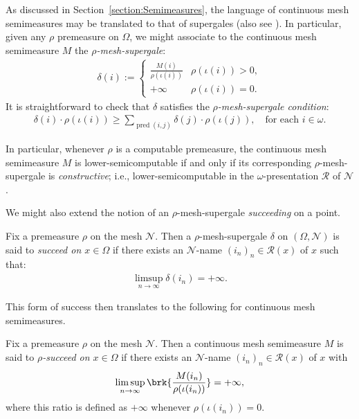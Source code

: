 As discussed in Section~\ref{section:Semimeasures}, the language of continuous mesh semimeasures may be translated to that of supergales (also see \cite{May14}). In particular, given any $\rho$ premeasure on $\Omega$, we might associate to the continuous mesh semimeasure $M$ the \textit{$\rho$-mesh-supergale}: 
\begin{align*}
    \delta(i) := \begin{cases}
        \frac{M(i)}{\rho(\iota(i))} & \rho(\iota(i)) > 0,\\
        +\infty & \rho(\iota(i)) = 0.
    \end{cases}
\end{align*}
It is straightforward to check that $\delta$ satisfies the \textit{$\rho$-mesh-supergale condition}:
\begin{align*}
    \delta(i) \cdot \rho(\iota(i)) \geq \sum_{\operatorname{pred}(i, j)} \delta(j) \cdot \rho(\iota(j)), \quad \text{for each $i \in \omega$}.
\end{align*}

In particular, whenever $\rho$ is a computable premeasure, the continuous mesh semimeasure $M$ is lower-semicomputable if and only if its corresponding $\rho$-mesh-supergale is \textit{constructive}; i.e., lower-semicomputable in the $\omega$-presentation $\mathscr{R}$ of $\mathcal{N}$. 

We might also extend the notion of an $\rho$-mesh-supergale \textit{succeeding} on a point.
\begin{definition}
    Fix a premeasure $\rho$ on the mesh $\mathcal{N}$. Then a $\rho$-mesh-supergale $\delta$ on $(\Omega, \mathcal{N})$ is said to \textit{succeed on $x \in \Omega$} if there exists an $\mathcal{N}$-name $(i_n)_n \in \mathcal{R}(x)$ of $x$ such that:
    \begin{align*}
        \limsup_{n \to \infty} \delta(i_n) = + \infty.
    \end{align*}
\end{definition}
This form of success then translates to the following for continuous mesh semimeasures.
\begin{definition}
    Fix a premeasure $\rho$ on the mesh $\mathcal{N}$. Then a continuous mesh semimeasure $M$ is said to \textit{$\rho$-succeed on $x \in \Omega$} if there exists an $\mathcal{N}$-name $(i_n)_n \in \mathcal{R}(x)$ of $x$ with
    \begin{align*}
        \limsup_{n \to \infty} \brk{\frac{M(i_n)}{\rho(\iota(i_n))}} = + \infty,
    \end{align*}
    where this ratio is defined as $+\infty$ whenever $\rho(\iota(i_n)) = 0$. 
\end{definition}

